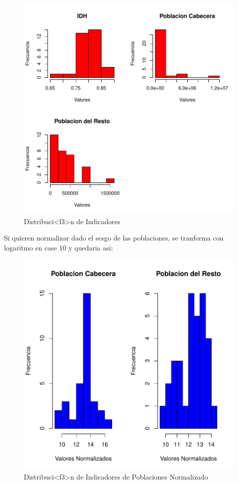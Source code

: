 \documentclass{article}
\begin{document}
\begin{figure}[h]
\centering
\includegraphics{Preliminar-hist1}
\caption{Distribuci<f3>n de Indicadores}
\label{hist1}
\end{figure}

Si quieren normalizar dado el sesgo de las poblaciones, se tranforma con logaritmo en case 10 y quedaria asi:

\begin{figure}[h]
\centering
\includegraphics{Preliminar-hist}
\caption{Distribuci<f3>n de Indicadores de Poblaciones Normalizado}
\label{hist}
\end{figure}



\renewcommand{\refname}{Bibliografia}

\end{document}
